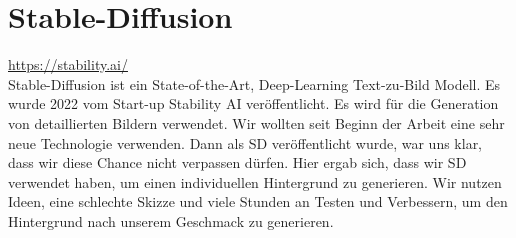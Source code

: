 \section{Stable-Diffusion}
\url{https://stability.ai/}\\
Stable-Diffusion ist ein State-of-the-Art, Deep-Learning Text-zu-Bild Modell. Es wurde 2022 vom Start-up Stability AI veröffentlicht. Es wird für die Generation von detaillierten Bildern verwendet. Wir wollten seit
Beginn der Arbeit eine sehr neue Technologie verwenden. Dann als SD veröffentlicht wurde, war uns klar, dass wir diese Chance nicht verpassen dürfen. Hier ergab sich, dass wir SD verwendet haben, um einen individuellen
Hintergrund zu generieren. Wir nutzen Ideen, eine schlechte Skizze und viele Stunden an Testen und Verbessern, um den Hintergrund nach unserem Geschmack zu generieren.

